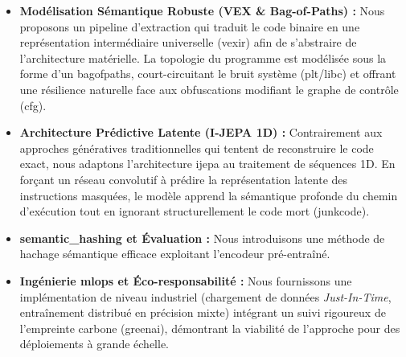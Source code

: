 \begin{itemize}
    \item \textbf{Modélisation Sémantique Robuste (VEX \& Bag-of-Paths) :} Nous proposons un pipeline d'extraction qui traduit le code binaire en une représentation intermédiaire universelle (\gls{vexir}) afin de s'abstraire de l'architecture matérielle.
      La topologie du programme est modélisée sous la forme d'un \gls{bagofpaths}, court-circuitant le bruit système (\gls{plt}/\gls{libc}) et offrant une résilience naturelle face aux obfuscations modifiant le graphe de contrôle (\gls{cfg}).
    
    \item \textbf{Architecture Prédictive Latente (I-JEPA 1D) :} Contrairement aux approches génératives traditionnelles qui tentent de reconstruire le code exact, nous adaptons l'architecture \gls{ijepa} au traitement de séquences 1D.
      En forçant un réseau convolutif à prédire la représentation latente des instructions masquées, le modèle apprend la sémantique profonde du chemin d'exécution tout en ignorant structurellement le code mort (\gls{junkcode}).
    
    \item \textbf{\gls{semantic_hashing} et Évaluation :} Nous introduisons une méthode de hachage sémantique efficace exploitant l'encodeur pré-entraîné.
    
    \item \textbf{Ingénierie \gls{mlops} et Éco-responsabilité :} Nous fournissons une implémentation de niveau industriel (chargement de données \textit{Just-In-Time}, entraînement distribué en précision mixte) intégrant un suivi rigoureux de l'empreinte carbone (\gls{greenai}), démontrant la viabilité de l'approche pour des déploiements à grande échelle.
\end{itemize}

